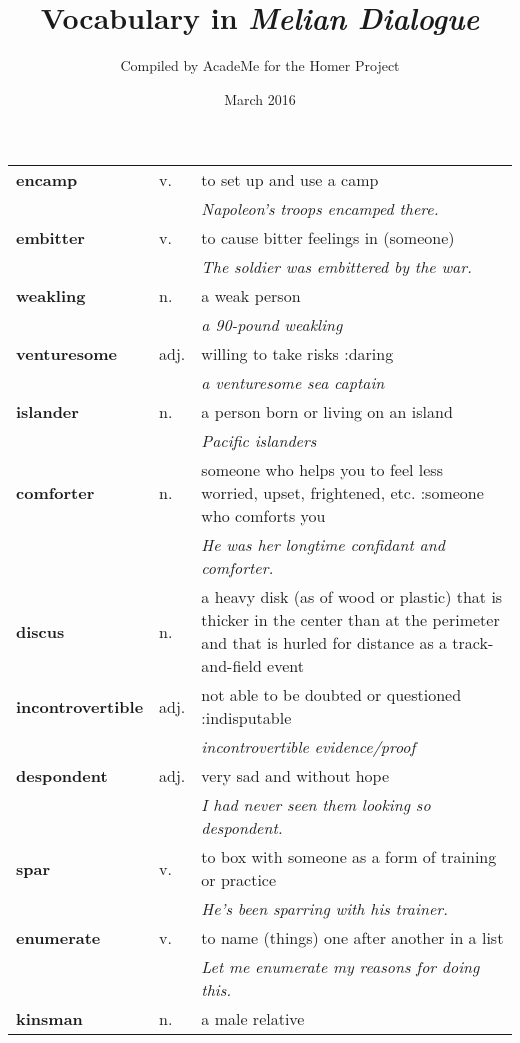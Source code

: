 \documentclass[a4paper]{article}
\title{Vocabulary in \textit{Melian Dialogue}}
\author{Compiled by AcadeMe for the Homer Project}
\date{March 2016}
\begin{document}
\maketitle
\begin{longtable}{llp{11cm}}
\textbf{encamp} & v. &  to set up and use a camp \\
 & & \textit{Napoleon's troops encamped there.}\\[0.08cm]
\textbf{embitter} & v. &  to cause bitter feelings in (someone) \\
 & & \textit{The soldier was embittered by the war.}\\[0.08cm]
\textbf{weakling} & n. &  a weak person \\
 & & \textit{a 90-pound weakling}\\[0.08cm]
\textbf{venturesome} & adj. &  willing to take risks :daring \\
 & & \textit{a venturesome sea captain}\\[0.08cm]
\textbf{islander} & n. &  a person born or living on an island \\
 & & \textit{Pacific islanders}\\[0.08cm]
\textbf{comforter} & n. &  someone who helps you to feel less worried, upset, frightened, etc. :someone who comforts you \\
 & & \textit{He was her longtime confidant and comforter.}\\[0.08cm]
\textbf{discus} & n. &  a heavy disk (as of wood or plastic) that is thicker in the center than at the perimeter and that is hurled for distance as a track-and-field event\\[0.08cm]
\textbf{incontrovertible} & adj. &  not able to be doubted or questioned :indisputable \\
 & & \textit{incontrovertible evidence/proof}\\[0.08cm]
\textbf{despondent} & adj. &  very sad and without hope \\
 & & \textit{I had never seen them looking so despondent.}\\[0.08cm]
\textbf{spar} & v. &  to box with someone as a form of training or practice \\
 & & \textit{He's been sparring with his trainer.}\\[0.08cm]
\textbf{enumerate} & v. &  to name (things) one after another in a list \\
 & & \textit{Let me enumerate my reasons for doing this.}\\[0.08cm]
\textbf{kinsman} & n. &  a male relative \\

\end{longtable}
\end{document}
